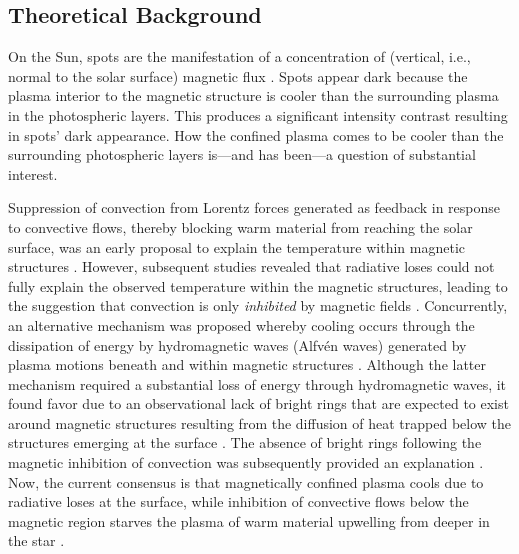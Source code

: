 \subsection{Theoretical Background}

On the Sun, spots are the manifestation of a concentration of (vertical, i.e., normal to the solar surface) magnetic flux \citep{Hale1908}. Spots appear dark because the plasma interior to the magnetic structure is cooler than the surrounding plasma in the photospheric layers. This produces a significant intensity contrast resulting in spots' dark appearance. How the confined plasma comes to be cooler than the surrounding photospheric layers is---and has been---a question of substantial interest. 

Suppression of convection from Lorentz forces generated as feedback in response to convective flows, thereby blocking warm material from reaching the solar surface, was an early proposal to explain the temperature within magnetic structures \citep{Biermann1941}. However, subsequent studies revealed that radiative loses could not fully explain the observed temperature within the magnetic structures, leading to the suggestion that convection is only \emph{inhibited} by magnetic fields \citep{Deinzer1965}. Concurrently, an alternative mechanism was proposed whereby cooling occurs through the dissipation of energy by hydromagnetic waves (Alfv\'{e}n waves) generated by plasma motions beneath and within magnetic structures \citep{Alfven1942,Parker1974b}. Although the latter mechanism required a substantial loss of energy through hydromagnetic waves, it found favor due to an observational lack of bright rings that are expected to exist around magnetic structures resulting from the diffusion of heat trapped below the structures emerging at the surface \citep{Parker1974b}. The absence of bright rings following the magnetic inhibition of convection was subsequently provided an explanation \citep{Spruit1977,Spruit1982a}. Now, the current consensus is that magnetically confined plasma cools due to radiative loses at the surface, while inhibition of convective flows below the magnetic region starves the plasma of warm material upwelling from deeper in the star \citep[see, e.g., reviews by][]{Rempel2011,Stein2012}.  

